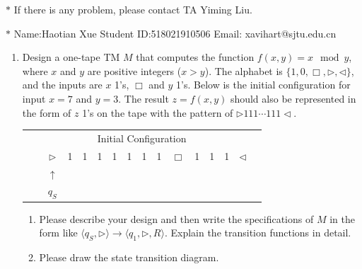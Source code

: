 \documentclass[12pt,a4paper]{article}
\theoremstyle{definition}
\begin{document}
\noindent
{}
\noindent{}
\begin{center}
\footnotesize{\color{red}$*$ If there is any problem, please contact TA Yiming Liu. }

\footnotesize{\color{blue}$*$ Name:Haotian Xue  \quad Student ID:518021910506 \quad Email: xavihart@sjtu.edu.cn}

\end{center}

\begin{enumerate}

\item
Design a one-tape TM $M$ that computes the function $f(x, y) = x \mod y$, where $x$ and $y$ are positive integers ($x > y$). The alphabet is $\{1, 0, \Box, \triangleright, \triangleleft\}$, and the inputs are $x$ 1's, $\Box$ and $y$ 1's. Below is the initial configuration for input $x=7$ and $y=3$. The result $z=f(x, y)$ should also be represented in the form of $z$ 1's on the tape with the pattern of $\triangleright 111 \cdots 111 \triangleleft$.
\begin{center}
	\begin{tabular}{ll|c|c|c|c|c|c|c|c|c|c|c|c|c|c}
		& \multicolumn{14}{c}{Initial Configuration}\\[5pt]
		\cline{2-16}
		& & $\triangleright$ &  1  & 1 & 1 & 1 & 1 & 1 & 1 & $\Box$ & 1 & 1 & 1 & $ \triangleleft$ & \\
		\cline{2-16}
		\multicolumn{2}{c}{} & \multicolumn{1}{c}{$\uparrow$} & \multicolumn{11}{c}{}\\
		\multicolumn{2}{c}{} & \multicolumn{1}{c}{$q_S$} & \multicolumn{11}{c}{}	
	\end{tabular}
\end{center}

\begin{enumerate}
	\item
	Please describe your design and then write the specifications of $M$ in the form like $\langle q_S, \triangleright \rangle \rightarrow \langle q_1, \triangleright,  R\rangle$. Explain the transition functions in detail.
	
	\item
	Please draw the state transition diagram.
	

\end{enumerate}
\end{enumerate}
\end{document}
